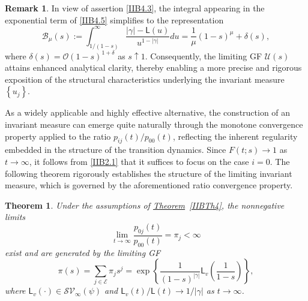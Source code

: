 \documentclass[10pt,reqno]{amsart}
\newtheorem{theorem}{Theorem}
\theoremstyle{definition}
\newtheorem{remark}{Remark}
\numberwithin{equation}{section}
\begin{document}
\begin{remark}                  \label{IIBRem3}
    In view of assertion {\eqref{IIB4.3}}, the integral appearing in the exponential term of {\eqref{IIB4.5}}
    simplifies to the representation
\begin{equation}                \label{IIB4.19}
    {{\mathcal{B}}_{\mu}}(s):=\int_{{1}/{(1-s)}}^{\infty}{\frac{|\gamma|-\textsf{L}(u)}{{u^{1-|\gamma|}}}du}
    =\frac{1}{\mu}{{\left(1-s\right)}^{\mu}}+\delta(s),
\end{equation}
    where $\delta(s)=\mathcal{O}{{(1-s)}^{1+\delta}}$ as $s\uparrow{1}$. Consequently, the limiting
    GF $\mathcal{U}(s)$ attains enhanced analytical clarity, thereby enabling a more precise and rigorous
    exposition of the structural characteristics underlying the invariant measure $\left\{{u_j}\right\}$.
\end{remark}

    As a widely applicable and highly effective alternative, the construction of an invariant measure can emerge
    quite naturally through the monotone convergence property applied to the ratio ${{p_{ij}}(t)}\big/{{p_{00}}(t)}$,
    reflecting the inherent regularity embedded in the structure of the transition dynamics. Since $F(t;s)\to{1}$
    as $t\to\infty$, it follows from {\eqref{IIB2.1}} that it suffices to focus on the case $i=0$. The following
    theorem rigorously establishes the structure of the limiting invariant measure, which is governed by
    the aforementioned ratio convergence property.

\begin{theorem}                      \label{IIBTh5}
    Under the assumptions of {\hyperref[IIBTh4]{Theorem}~\ref{IIBTh4}}, the nonnegative limits
\[
    \lim_{t\to\infty}\frac{{p_{0j}}(t)}{{p_{00}}(t)}={{\pi}_{j}}<\infty
\]
    exist and are generated by the limiting GF
\begin{equation}                \label{IIB4.20}
    \pi(s)=\sum_{j\in\mathcal{E}}{{{\pi}_{j}}{s^j}}=
    \exp\left\{\frac{1}{{(1-s)}^{|\gamma|}}{\textsf{L}_{v}}\left(\frac{1}{1-s}\right)\right\},
\end{equation}
    where ${\textsf{L}_{v}}(\cdot )\in{{\mathcal{SV}}_{\infty}}(\psi)$ and
    ${{\textsf{L}_{v}}(t)}\big/{\textsf{L}(t)}\to{{1}\big/{|\gamma|}}$ as $t\to\infty$.
\end{theorem}
\end{document}
